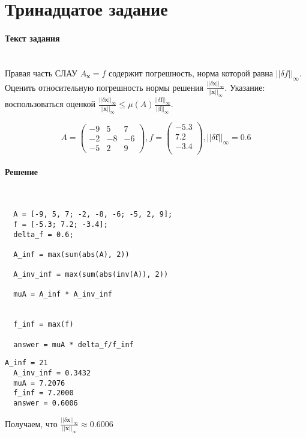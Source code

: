 \section{Тринадцатое задание}
\paragraph{Текст задания} ~\\
Правая часть СЛАУ $A_{\textbf{x}} = f$ содержит погрешность, норма которой равна $||\delta f||_{\infty}$. Оценить относительную погрешность нормы решения $\frac{||\delta \textbf{x}||_{\infty}}{||\textbf{x}||_{\infty}}$. Указание: воспользоваться оценкой $\frac{|| \delta \textbf{x}||_{\infty}}{||\textbf{x}||_{\infty}} \leq \mu(A) \frac{||\delta \textbf{f}||_{\infty}}{||\textbf{f}||_{\infty}}$.

\[
  A =
  \begin{pmatrix}
    -9 & 5 & 7\\
    -2 & -8& -6\\
    -5 & 2 & 9
  \end{pmatrix}
  , f =
  \begin{pmatrix}
    -5.3\\
    7.2\\
    -3.4\\
  \end{pmatrix}
  , ||\delta \textbf{f}||_{\infty} = 0.6
\]

\paragraph{Решение} ~\\
\begin{lstlisting}
  A = [-9, 5, 7; -2, -8, -6; -5, 2, 9];
  f = [-5.3; 7.2; -3.4];
  delta_f = 0.6;

  A_inf = max(sum(abs(A), 2))

  A_inv_inf = max(sum(abs(inv(A)), 2))

  muA = A_inf * A_inv_inf


  f_inf = max(f)

  answer = muA * delta_f/f_inf
\end{lstlisting}
\begin{lstlisting}[backgroundcolor=\color{cyan}]
  A_inf = 21
  A_inv_inf = 0.3432
  muA = 7.2076
  f_inf = 7.2000
  answer = 0.6006
\end{lstlisting}
Получаем, что $\frac{||\delta \textbf{x}||_{\infty}}{||\textbf{x}||_{\infty}} \approx 0.6006$

